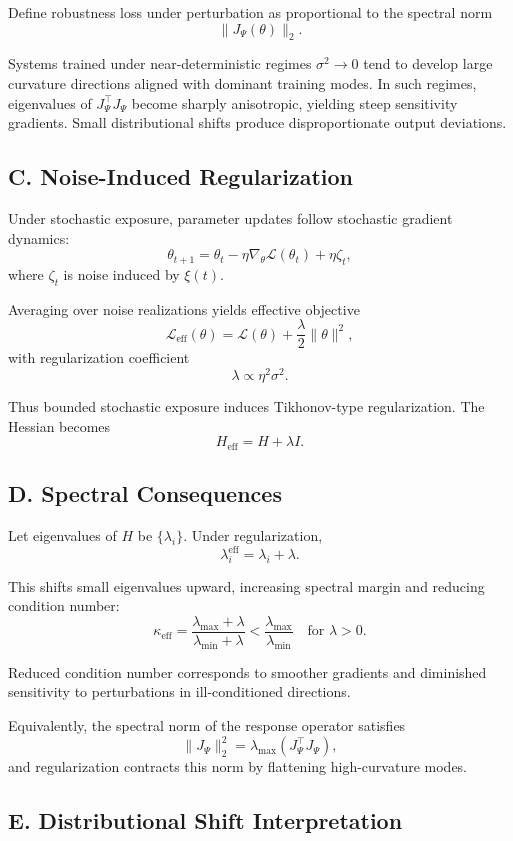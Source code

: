 \documentclass[11pt]{article}
\theoremstyle{remark}
\begin{document}
Define robustness loss under perturbation as proportional to the spectral norm
\[
\|J_\Psi(\theta)\|_2.
\]

Systems trained under near-deterministic regimes $\sigma^2 \to 0$ tend to develop large curvature directions aligned with dominant training modes. In such regimes, eigenvalues of $J_\Psi^\top J_\Psi$ become sharply anisotropic, yielding steep sensitivity gradients. Small distributional shifts produce disproportionate output deviations.

\subsection*{C. Noise-Induced Regularization}

Under stochastic exposure, parameter updates follow stochastic gradient dynamics:
\[
\theta_{t+1}
=
\theta_t
-
\eta \nabla_\theta \mathcal{L}(\theta_t)
+
\eta \zeta_t,
\]
where $\zeta_t$ is noise induced by $\xi(t)$.

Averaging over noise realizations yields effective objective
\[
\mathcal{L}_{\text{eff}}(\theta)
=
\mathcal{L}(\theta)
+
\frac{\lambda}{2} \|\theta\|^2,
\]
with regularization coefficient
\[
\lambda \propto \eta^2 \sigma^2.
\]

Thus bounded stochastic exposure induces Tikhonov-type regularization. The Hessian becomes
\[
H_{\text{eff}}
=
H
+
\lambda I.
\]

\subsection*{D. Spectral Consequences}

Let eigenvalues of $H$ be $\{\lambda_i\}$. Under regularization,
\[
\lambda_i^{\text{eff}} = \lambda_i + \lambda.
\]

This shifts small eigenvalues upward, increasing spectral margin and reducing condition number:
\[
\kappa_{\text{eff}}
=
\frac{\lambda_{\max} + \lambda}{\lambda_{\min} + \lambda}
<
\frac{\lambda_{\max}}{\lambda_{\min}}
\quad \text{for } \lambda > 0.
\]

Reduced condition number corresponds to smoother gradients and diminished sensitivity to perturbations in ill-conditioned directions.

Equivalently, the spectral norm of the response operator satisfies
\[
\|J_\Psi\|_2^2
=
\lambda_{\max}(J_\Psi^\top J_\Psi),
\]
and regularization contracts this norm by flattening high-curvature modes.

\subsection*{E. Distributional Shift Interpretation}
\end{document}
